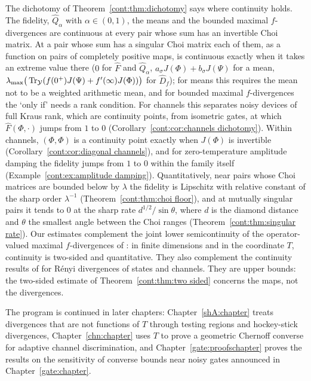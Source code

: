 The dichotomy of Theorem~\ref{cont:thm:dichotomy} says where continuity holds. The fidelity, $\widehat{Q}_\alpha$ with $\alpha\in(0,1)$, the means and the bounded maximal $f$-divergences are continuous at every pair whose sum has an invertible Choi matrix. At a pair whose sum has a singular Choi matrix each of them, as a function on pairs of completely positive maps, is continuous exactly when it takes an extreme value there ($0$ for $\widehat{F}$ and $\widehat{Q}_\alpha$, $a_\sigma J(\Phi)+b_\sigma J(\Psi)$ for a mean, $\lambda_{\max}\big(\operatorname{Tr}_{\mathcal{Y}}(f(0^+)J(\Psi)+f'(\infty)J(\Phi))\big)$ for $\widehat{D}_f$); for means this requires the mean not to be a weighted arithmetic mean, and for bounded maximal $f$-divergences the `only if' needs a rank condition. For channels this separates noisy devices of full Kraus rank, which are continuity points, from isometric gates, at which $\widehat{F}(\Phi,\cdot)$ jumps from $1$ to $0$ (Corollary~\ref{cont:cor:channels dichotomy}).
Within channels, $(\Phi,\Phi)$ is a continuity point exactly when $J(\Phi)$ is invertible (Corollary~\ref{cont:cor:diagonal channels}), and for zero-temperature amplitude damping the fidelity jumps from $1$ to $0$ within the family itself (Example~\ref{cont:ex:amplitude damping}). Quantitatively, near pairs whose Choi matrices are bounded below by $\lambda$ the fidelity is Lipschitz with relative constant of the sharp order $\lambda^{-1}$ (Theorem~\ref{cont:thm:choi floor}), and at mutually singular pairs it tends to $0$ at the sharp rate $d^{1/2}/\sin\theta$, where $d$ is the diamond distance and $\theta$ the smallest angle between the Choi ranges (Theorem~\ref{cont:thm:singular rate}). Our estimates complement the joint lower semicontinuity of the operator-valued maximal $f$-divergences of \cite[Theorem~4.7]{Okayasu2026maxf}: in finite dimensions and in the coordinate $T$, continuity is two-sided and quantitative. They also complement the continuity results of \cite{MosonyiHiai2024} for R\'enyi divergences of states and channels. They are upper bounds: the two-sided estimate of Theorem~\ref{cont:thm:two sided} concerns the maps, not the divergences.

The program is continued in later chapters: Chapter~\ref{shA:chapter} treats divergences that are not functions of $T$ through testing regions and hockey-stick divergences, Chapter~\ref{chn:chapter} uses $T$ to prove a geometric Chernoff converse for adaptive channel discrimination, and Chapter~\ref{gate:proofschapter} proves the results on the sensitivity of converse bounds near noisy gates announced in Chapter~\ref{gate:chapter}.

